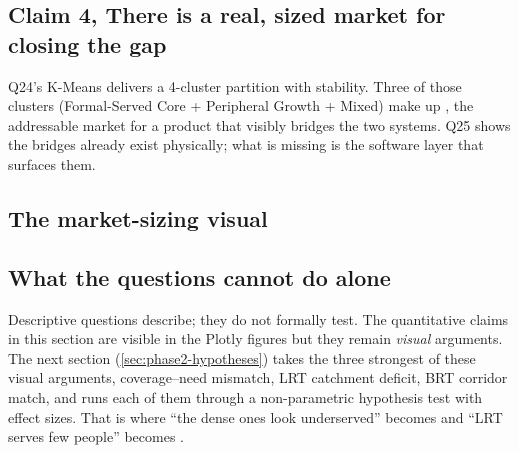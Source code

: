 \subsection*{Claim 4, There is a real, sized market for closing the gap}

Q24's K-Means delivers a 4-cluster partition with 
stability. Three of those clusters
(Formal-Served Core + Peripheral Growth + Mixed) make up
, 
the addressable market for a product that visibly bridges the two
systems. Q25 shows the bridges already exist physically; what is
missing is the software layer that surfaces them.

\subsection*{The market-sizing visual}



\subsection*{What the questions cannot do alone}

Descriptive questions describe; they do not formally test. The
quantitative claims in this section are visible in the Plotly figures
but they remain \emph{visual} arguments. The next section
(\ref{sec:phase2-hypotheses}) takes the three strongest of these
visual arguments, coverage--need mismatch, LRT catchment deficit, BRT
corridor match, and runs each of them through a non-parametric
hypothesis test with effect sizes. That is where ``the dense ones
look underserved'' becomes  and ``LRT
serves few people'' becomes .
